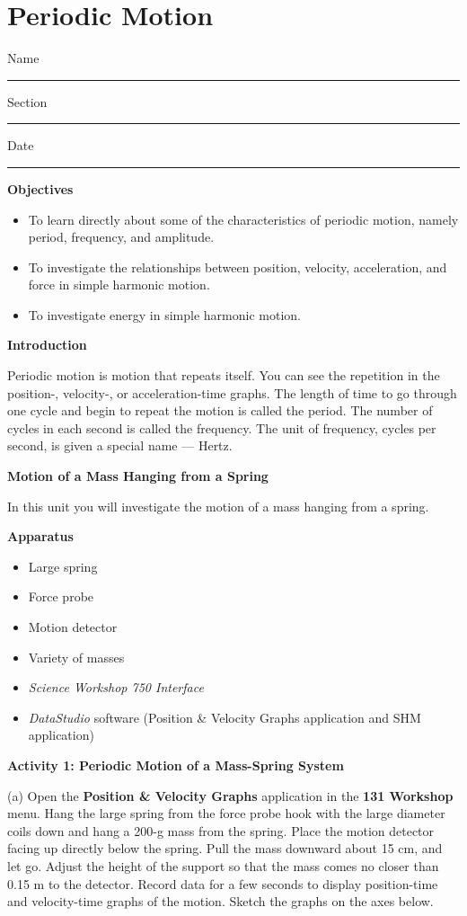 
\section{Periodic Motion}

Name \rule{2.0in}{0.1pt}\hfill{}Section \rule{1.0in}{0.1pt}\hfill{}Date \rule{1.0in}{0.1pt}

{\bf Objectives }

\begin{itemize}
\item To learn directly about some of the characteristics of periodic motion, namely period, frequency, and amplitude. 
\item To investigate the relationships between position, velocity, acceleration, and force in simple harmonic motion. 
\item To investigate energy in simple harmonic motion.
\end{itemize}
\textbf{Introduction }

Periodic motion is motion that repeats itself. You can see the repetition in
the position-, velocity-, or acceleration-time graphs. The length of time to
go through one cycle and begin to repeat the motion is called the period. The
number of cycles in each second is called the frequency. The unit of frequency,
cycles per second, is given a special name --- Hertz.

\textbf{Motion of a Mass Hanging from a Spring} 

In this unit you will investigate the motion of a mass hanging from a spring.

\textbf{Apparatus} 

\begin{itemize}
\item Large spring 
\item Force probe 
\item Motion detector 
\item Variety of masses 
\item \textit{Science Workshop 750 Interface}
\item \textit{DataStudio} software (Position \& Velocity Graphs application and SHM
application)
\end{itemize}
\textbf{Activity 1: Periodic Motion of a Mass-Spring System} 

(a) Open the \textbf{Position \& Velocity Graphs} application in the \textbf{131 Workshop} menu.
Hang the large spring from the force probe hook with the
large diameter coils down and hang a 200-g mass from the spring. Place the motion detector facing up directly below the spring. Pull the mass downward about 
15 cm, and let go. Adjust the height of the support so that the mass comes no
closer than 0.15 m to the detector. Record data for a few seconds to display
position-time and velocity-time graphs of the motion. Sketch the graphs on the
axes below.

